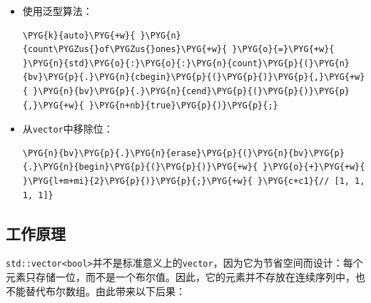 \begin{itemize}

\item 使用泛型算法：



\begin{codeblockbg}
\begin{Verbatim}[commandchars=\\\{\},breaklines=true,breakanywhere=true,fontsize=\codefont,xleftmargin=17bp]
\PYG{k}{auto}\PYG{+w}{ }\PYG{n}{count\PYGZus{}of\PYGZus{}ones}\PYG{+w}{ }\PYG{o}{=}\PYG{+w}{ }\PYG{n}{std}\PYG{o}{:}\PYG{o}{:}\PYG{n}{count}\PYG{p}{(}\PYG{n}{bv}\PYG{p}{.}\PYG{n}{cbegin}\PYG{p}{(}\PYG{p}{)}\PYG{p}{,}\PYG{+w}{ }\PYG{n}{bv}\PYG{p}{.}\PYG{n}{cend}\PYG{p}{(}\PYG{p}{)}\PYG{p}{,}\PYG{+w}{ }\PYG{n+nb}{true}\PYG{p}{)}\PYG{p}{;}
\end{Verbatim}
\end{codeblockbg}



\item 从\texttt{vector}中移除位：



\begin{codeblockbg}
\begin{Verbatim}[commandchars=\\\{\},breaklines=true,breakanywhere=true,fontsize=\codefont,xleftmargin=17bp]
\PYG{n}{bv}\PYG{p}{.}\PYG{n}{erase}\PYG{p}{(}\PYG{n}{bv}\PYG{p}{.}\PYG{n}{begin}\PYG{p}{(}\PYG{p}{)}\PYG{+w}{ }\PYG{o}{+}\PYG{+w}{ }\PYG{l+m+mi}{2}\PYG{p}{)}\PYG{p}{;}\PYG{+w}{ }\PYG{c+c1}{// [1, 1, 1, 1]}
\end{Verbatim}
\end{codeblockbg}

\end{itemize}



\subsection{工作原理}



\texttt{std::\allowbreak{}vector<\allowbreak{}bool>}并不是标准意义上的\texttt{vector}，因为它为节省空间而设计：每个元素只存储一位，而不是一个布尔值。因此，它的元素并不存放在连续序列中，也不能替代布尔数组。由此带来以下后果：



